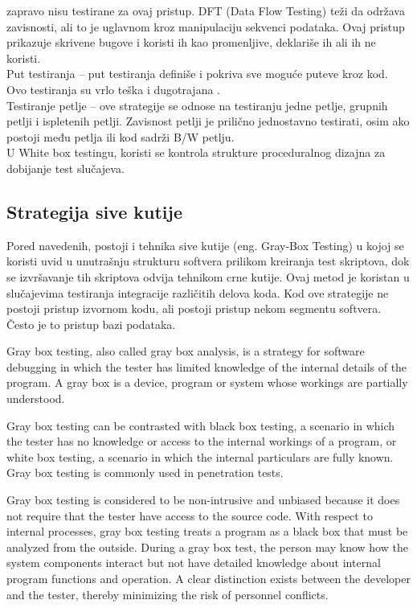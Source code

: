\documentclass[12pt,oneside]{memoir}
\begin{document}
zapravo nisu testirane za ovaj pristup. DFT (Data Flow Testing) teži da održava zavisnosti, ali to 
je  uglavnom  kroz  manipulaciju  sekvenci  podataka.  Ovaj  pristup  prikazuje  skrivene  bugove  i 
koristi ih kao promenljive, deklariše ih ali ih ne koristi.\\
Put testiranja
–
put testiranja definiše i pokriva sve moguće puteve kroz kod. Ovo testiranja 
su  vrlo teška i dugotrajana
.\\
Testiranje  petlje
–  ove  strategije  se  odnose  na  testiranju  jedne  petlje,  grupnih  petlji  i 
ispletenih petlji. Zavisnost petlji je prilično jednostavno testirati, osim ako postoji među petlja ili 
kod sadrži B/W petlju.\\
U White box testingu, koristi se kontrola strukture proceduralnog dizajna za dobijanje test slučajeva. 
\subsection{Strategija sive kutije}
Pored navedenih, postoji i tehnika sive kutije (eng. Gray-Box Testing) u  kojoj se koristi uvid  u  unutrašnju  strukturu  softvera  prilikom  kreiranja
test  skriptova,  dok  se  izvršavanje  tih skriptova odvija tehnikom crne kutije.
Ovaj metod je koristan u slučajevima testiranja integracije različitih delova koda. Kod ove strategije ne postoji pristup izvornom kodu,
ali postoji pristup nekom segmentu softvera. Često je to pristup bazi
podataka.\par
Gray box testing, also called gray box analysis, is a strategy for software debugging in which the tester has limited knowledge of the internal details of the program. A gray box is a device, program or system whose workings are partially understood.

Gray box testing can be contrasted with black box testing, a scenario in which the tester has no knowledge or access to the internal workings of a program, or white box testing, a scenario in which the internal particulars are fully known. Gray box testing is commonly used in penetration tests. 

Gray box testing is considered to be non-intrusive and unbiased because it does not require that the tester have access to the source code. With respect to internal processes, gray box testing treats a program as a black box that must be analyzed from the outside. During a gray box test, the person may know how the system components interact but not have detailed knowledge about internal program functions and operation. A clear distinction exists between the developer and the tester, thereby minimizing the risk of personnel conflicts. 
\end{document}
